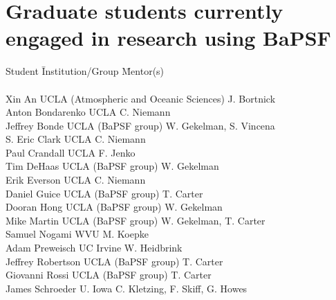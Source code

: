 \documentclass[11pt]{article}
\date{}
\title{}
\begin{document}
\section{Graduate students currently engaged in research using BaPSF}

\begin{tabbing}
Student \hspace{0.8in} \=  Institution/Group \hspace{2.1in} \= Mentor(s) \\
\\
Xin An \> UCLA (Atmospheric and Oceanic Sciences) \> J. Bortnick\\
Anton Bondarenko \> UCLA \> C. Niemann\\
Jeffrey Bonde \> UCLA (BaPSF group) \> W. Gekelman, S. Vincena \\
S. Eric Clark \> UCLA \> C. Niemann\\
Paul Crandall \> UCLA \> F. Jenko \\
Tim DeHaas \> UCLA (BaPSF group) \> W. Gekelman \\
Erik Everson \> UCLA \> C. Niemann\\
Daniel Guice \> UCLA (BaPSF group) \> T. Carter \\
Dooran Hong \> UCLA (BaPSF group) \> W. Gekelman\\
Mike Martin \> UCLA (BaPSF group) \> W. Gekelman, T. Carter \\
Samuel Nogami \> WVU \> M. Koepke \\
Adam Preweisch \> UC Irvine \> W. Heidbrink\\
Jeffrey Robertson \> UCLA (BaPSF group) \> T. Carter \\
Giovanni Rossi \> UCLA (BaPSF group) \> T. Carter \\
James Schroeder \> U. Iowa \> C. Kletzing, F. Skiff, G. Howes \\
\end{tabbing}
\end{document}

